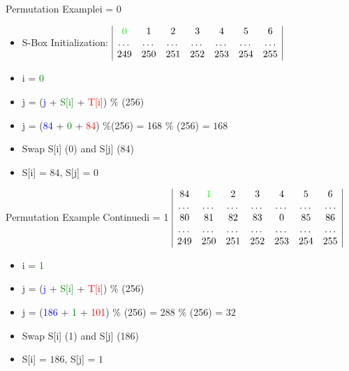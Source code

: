 \documentclass[
	aspectratio=169,	%
	onlytextwidth,		%
	t,					%
	]{beamer}
\begin{document}
\begin{frame}{Permutation Example}{i = 0}
	\begin{itemize}
		\item S-Box Initialization:
		\medskip
		$\begin{array}{|ccccccc|}
		\textcolor{green}{0} & 1 & 2 & 3 & 4 & 5 & 6 \\
		\dots & \dots & \dots & \dots & \dots & \dots & \dots \\
		249 & 250 & 251 & 252 & 253 & 254 & 255 \\
		\end{array}$
		\item i = \textcolor{green}{0}
		\item j = (\textcolor{blue} {j} + \textcolor{green}{S[i]} + \textcolor{red}{T[i]}) $\%$ (256)
		\item j = (\textcolor{blue} {84} + \textcolor{green} {0} + \textcolor{red} {84}) $\%$(256) = 168 $\%$ (256) = $168$
		\item Swap S[i] (0) and S[j] (84)
		\item S[i] = $84$, S[j] = $0$
	\end{itemize}
\end{frame}

\begin{frame}{Permutation Example Continued}{i = 1}
	$\begin{array}{|ccccccc|}
		84 & \textcolor{green}{1} & 2 & 3 & 4 & 5 & 6 \\
		\dots & \dots & \dots & \dots & \dots & \dots & \dots \\
		80 & 81 & 82 & 83 & 0 & 85 & 86 \\
		\dots & \dots & \dots & \dots & \dots & \dots & \dots \\
		249 & 250 & 251 & 252 & 253 & 254 & 255 \\
	\end{array}$
	\begin{itemize}
		\item i = \textcolor{green}{1}
		\item j = (\textcolor{blue} {j} + \textcolor{green}{S[i]} + \textcolor{red}{T[i]}) $\%$ (256)
		\item j = (\textcolor{blue} {186} + \textcolor{green} {1} + \textcolor{red} {101}) $\%$ (256) = 288 $\%$ (256) = $32$
		\item Swap S[i] (1) and S[j] (186)
		\item S[i] = $186$, S[j] = $1$
	\end{itemize}
\end{frame}
\end{document}
